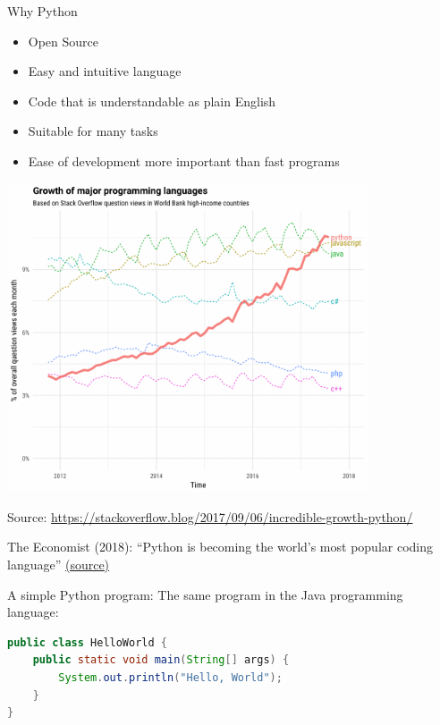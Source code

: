 \documentclass{beamer}
\begin{document}
\begin{frame}{Why Python}
    \begin{itemize}
        \item Open Source
        \item Easy and intuitive language
        \item Code that is understandable as plain English
        \item Suitable for many tasks
        \item Ease of development more important than fast programs
    \end{itemize}
\end{frame}

\begin{frame}
    \centering
    \includegraphics[width=0.8\textwidth]{fig/pythongrowth.png}

    Source: \url{https://stackoverflow.blog/2017/09/06/incredible-growth-python/}

    The Economist (2018): ``Python is becoming the world’s most popular coding language''
    \href{https://www.economist.com/graphic-detail/2018/07/26/python-is-becoming-the-worlds-most-popular-coding-language}{(source)}
\end{frame}

\begin{frame}[fragile]
A simple Python program:
\vspace{1em}
The same program in the Java programming language:
\begin{lstlisting}[language=java]
public class HelloWorld {
    public static void main(String[] args) {
        System.out.println("Hello, World");
    }
}
\end{lstlisting}
\end{frame}
\end{document}
